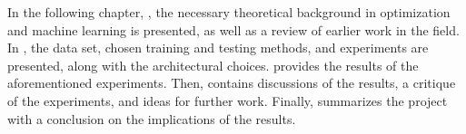 In the following chapter, , the necessary theoretical background in optimization and machine learning is presented, as well as a review of earlier work in the field. In , the data set, chosen training and testing methods, and experiments are presented, along with the architectural choices.  provides the results of the aforementioned experiments. Then,  contains discussions of the results, a critique of the experiments, and ideas for further work. Finally,  summarizes the project with a conclusion on the implications of the results. 


